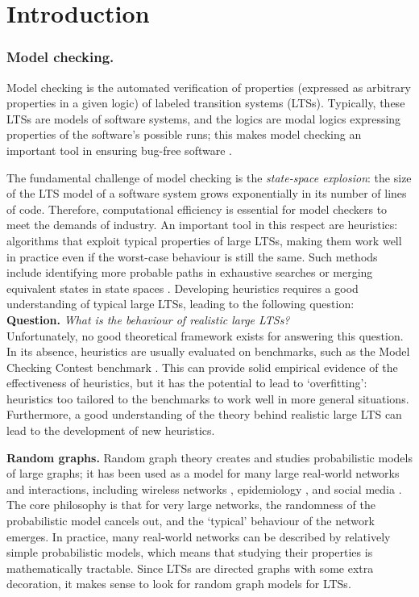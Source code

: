 \documentclass[runngingheads]{llncs}
\begin{document}
\section{Introduction}

\subsubsection{Model checking.} Model checking is the automated verification of properties (expressed as arbitrary properties in a given logic) of labeled transition systems (LTSs). Typically, these LTSs are models of software systems, and the logics are modal logics expressing properties of the software's possible runs; this makes model checking an important tool in ensuring bug-free software \cite{bauch2014ltl,chaki2004state}.

The fundamental challenge of model checking is the \emph{state-space explosion}: the size of the LTS model of a software system grows exponentially in its number of lines of code. Therefore, computational efficiency is essential for model checkers to meet the demands of industry. An important tool in this respect are heuristics: algorithms that exploit typical properties of large LTSs, making them work well in practice even if the worst-case behaviour is still the same. Such methods include identifying more probable paths in exhaustive searches \cite{edelkamp2006large} or merging equivalent states in state spaces \cite{jensen2022automata}. Developing heuristics requires a good understanding of typical large LTSs, leading to the following question:\\

\noindent \textbf{Question.} \emph{What is the behaviour of realistic large LTSs?}\\

Unfortunately, no good theoretical framework exists for answering this question. In its absence, heuristics are usually evaluated on benchmarks, such as the Model Checking Contest benchmark \cite{amat2023behind}. This can provide solid empirical evidence of the effectiveness of heuristics, but it has the potential to lead to `overfitting': heuristics too tailored to the benchmarks to work well in more general situations. Furthermore, a good understanding of the theory behind realistic large LTS can lead to the development of new heuristics.

\noindent \textbf{Random graphs.} Random graph theory creates and studies probabilistic models of large graphs; it has been used as a model for many large real-world networks and interactions, including wireless networks \cite{lu2013exploring}, epidemiology \cite{britton2020mathematical}, and social media \cite{adriaans2018weighted}. The core philosophy is that for very large networks, the randomness of the probabilistic model cancels out, and the `typical' behaviour of the network emerges. In practice, many real-world networks can be described by relatively simple probabilistic models, which means that studying their properties is mathematically tractable. Since LTSs are directed graphs with some extra decoration, it makes sense to look for random graph models for LTSs.
\end{document}

